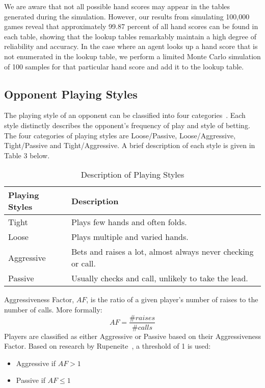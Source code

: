 \documentclass{article}
\begin{document}
\noindent We are aware that not all possible hand scores may appear in the tables generated during the simulation. However, our results from simulating 100,000 games reveal that approximately 99.87 percent of all hand scores can be found in each table, showing that the lookup tables remarkably maintain a high degree of reliability and accuracy. In the case where an agent looks up a hand score that is not enumerated in the lookup table, we perform a limited Monte Carlo simulation of 100 samples for that particular hand score and add it to the lookup table.

\subsection{Opponent Playing Styles}

The playing style of an opponent can be classified into four categories~\cite{rupeneite:Reinforcement}. Each style distinctly describes the opponent's frequency of play and style of betting. The four categories of playing styles are Loose/Passive, Loose/Aggressive, Tight/Passive and Tight/Aggressive. A brief description of each style is given in Table 3 below.

\begin{table}[h!]
  \begin{center}
    \begin{tabular}{|l|p{5cm}|}
    \hline
      \textbf{Playing Styles} & \textbf{Description} \\
      \hline
      Tight & Plays few hands and often folds. \\
      \hline
      Loose & Plays multiple and varied hands.  \\
      \hline
      Aggressive &  Bets and raises a lot, almost always never checking or call. \\
      \hline
      Passive & Usually checks and call, unlikely to take the lead. \\
      \hline
    \end{tabular}
    \caption{Description of Playing Styles}
    \label{tab:table3}
  \end{center}
\end{table}
Aggressiveness Factor, $AF$, is the ratio of a given player's number of raises to the number of calls. More formally:
\begin{displaymath}
  AF = \frac{\text{\# }raises}{\text{\# }calls}
\end{displaymath}
\noindent Players are classified as either Aggressive or Passive based on their Aggressiveness Factor. Based on research by Rupeneite~, a threshold of 1 is used:
\begin{itemize}
	\item Aggressive if $AF > 1$
	\item Passive if $AF \leq 1$
\end{itemize}
\end{document}
